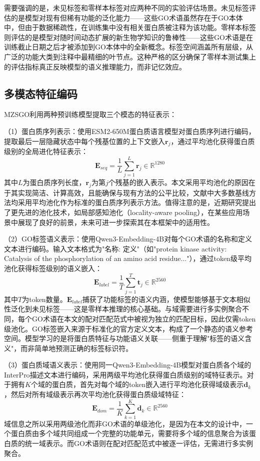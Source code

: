 需要强调的是，未见标签和零样本标签对应两种不同的实验评估场景。未见标签评估的是模型对现有但稀有功能的泛化能力——这些GO术语虽然存在于GO本体中，但由于数据稀疏性，在训练集中没有相关蛋白质被注释为该功能。零样本标签则评估的是模型对随时间动态扩展的新生物学知识的鲁棒性——这些GO术语是在训练截止日期之后才被添加到GO本体中的全新概念。标签空间涵盖所有层级，从广泛的功能大类到注释中最精细的叶节点。这种严格的区分确保了零样本测试集上的评估指标真正反映模型的语义推理能力，而非记忆效应。

\subsection{多模态特征编码}

MZSGO利用两种预训练模型提取三个模态的特征表示：

（1）蛋白质序列表示：使用ESM2-650M\cite{lin2023evolutionary}蛋白质语言模型对蛋白质序列进行编码，提取最后一层隐藏状态中每个残基位置的上下文嵌入$\mathbf{r}_j$，通过平均池化获得蛋白质级别的全局进化特征表示：
\begin{equation}
    \mathbf{E}_{seq} = \frac{1}{L} \sum_{j=1}^{L} \mathbf{r}_j \in \mathbb{R}^{1280}
\end{equation}
其中$L$为蛋白质序列长度，$\mathbf{r}_j$为第$j$个残基的嵌入表示。本文采用平均池化的原因在于其实现简洁、计算高效，且能确保与现有方法的公平比较，文献中大多数基线方法均采用平均池化作为标准的蛋白质序列表示方法。值得注意的是，近期研究提出了更先进的池化技术，如局部感知池化（locality-aware pooling）\cite{hoang2025locality}，在某些应用场景中展现了良好的前景，未来可进一步探索其在本框架中的适用性。

（2）GO标签语义表示：使用Qwen3-Embedding-4B\cite{zhang2025qwen3}对每个GO术语的名称和定义文本进行编码。输入文本格式为"名称: 定义"（如"protein kinase activity: Catalysis of the phosphorylation of an amino acid residue..."），通过token级平均池化获得标签级别的语义嵌入：
\begin{equation}
    \mathbf{E}_{label} = \frac{1}{T} \sum_{j=1}^{T} \mathbf{t}_j \in \mathbb{R}^{2560}
\end{equation}
其中$T$为token数量。$\mathbf{E}_{label}$捕获了功能标签的语义内涵，使模型能够基于文本相似性泛化到未见标签——这是零样本推理的核心基础。与域需要进行多实例聚合不同，每个GO术语在本文的配对匹配范式中被视为独立的匹配目标，因此仅需token级池化。GO标签嵌入来源于标准化的官方定义文本，构成了一个静态的语义参考空间。模型学习的是将蛋白质特征与功能语义关联——侧重于理解"标签的语义含义"，而非简单地预测正确的标签标识符。

（3）蛋白质域语义表示：使用同一Qwen3-Embedding-4B模型对蛋白质各个域的InterPro\cite{blum2025interpro}描述文本进行编码，采用两级平均池化获得蛋白质级别的域特征表示。对于拥有$K$个域的蛋白质，首先对每个域的token嵌入进行平均池化获得域级表示$\mathbf{d}_k$，然后对所有域级表示再次平均池化获得蛋白质级域特征：
\begin{equation}
    \mathbf{E}_{dom} = \frac{1}{K} \sum_{k=1}^{K} \mathbf{d}_k \in \mathbb{R}^{2560}
\end{equation}
域信息之所以采用两级池化而非GO术语的单级池化，是因为在本文的设计中，一个蛋白质由多个域共同组成一个完整的功能单元，需要将多个域的信息聚合为该蛋白质的统一域表示。而GO术语则在配对匹配范式中被逐一评估，无需进行多实例聚合。

